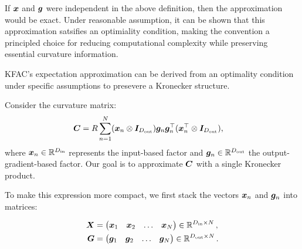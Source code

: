 If ${\bm{x}}$ and ${\bm{g}}$ were independent in the above definition, then the approximation would be exact.
Under reasonable assumption, it can be shown that this approximation satsifies an optimiality condition, making the convention a principled choice for reducing computational complexity while preserving essential curvature information.

\begin{example}
  \label{ex:just_kfac_exp_approx}
  KFAC's expectation approximation can be derived from an optimality condition under specific assumptions to presevere a Kronecker structure.

  Consider the curvature matrix:
  \begin{align*}
    {\bm{C}}
    &=
      R \sum_{n=1}^N
      ({\bm{x}}_n \otimes {\bm{I}}_{D_{\text{out}}})
      {\bm{g}}_n {\bm{g}}_n^{\top}
      ({\bm{x}}_n^{\top} \otimes {\bm{I}}_{D_{\text{out}}}),
  \end{align*}
  where ${\bm{x}}_n \in {\mathbb{R}}^{D_{\text{in}}}$ represents the input-based factor and ${\bm{g}}_n \in {\mathbb{R}}^{D_{\text{out}}}$ the output-gradient-based factor. Our goal is to approximate ${\bm{C}}$ with a single Kronecker product.

  To make this expression more compact, we first stack the vectors ${\bm{x}}_n$ and ${\bm{g}}_n$ into matrices:

  \begin{align*}
    {\bm{X}}
    &=
      \begin{pmatrix}
        {\bm{x}}_1 & {\bm{x}}_2 & \ldots & {\bm{x}}_N
      \end{pmatrix}
      \in {\mathbb{R}}^{D_{\text{in}} \times N}\,,
    \\
    {\bm{G}}
    &=
      \begin{pmatrix}
        {\bm{g}}_1 & {\bm{g}}_2 & \ldots & {\bm{g}}_N
      \end{pmatrix}
      \in {\mathbb{R}}^{D_{\text{out}} \times N}\,.
  \end{align*}


\end{example}
